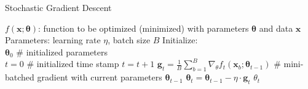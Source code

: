 \begin{algorithm}[H]
  \caption{Stochastic Gradient Descent}
  \begin{algorithmic}[1]\label{algo:optimizer-sgd}
    \Require $f \left(\mathbf{x}; \boldsymbol\theta\right)$:
    function to be optimized (minimized) with parameters $\boldsymbol\theta$ and data $\mathbf{x}$
    \Require Parameters: learning rate $\eta$, batch size $B$
    \Require Initialize: \\
    $\boldsymbol\theta_0$ \# initialized parameters\\
    $t = 0$ \# initialized time stamp
    \State $t = t + 1$
    \State $\mathbf{g}_t = \frac1B \sum_{b=1}^B \nabla_\theta f_t(\mathbf{x}_b; \boldsymbol\theta_{t-1})$
    \# mini-batched gradient with current parameters $\boldsymbol\theta_{t-1}$
    \State $\boldsymbol\theta_t = \boldsymbol\theta_{t-1} - \eta\cdot \mathbf{g}_t$
    \EndWhile
    \Ensure $\theta_t$
  \end{algorithmic}
\end{algorithm}

